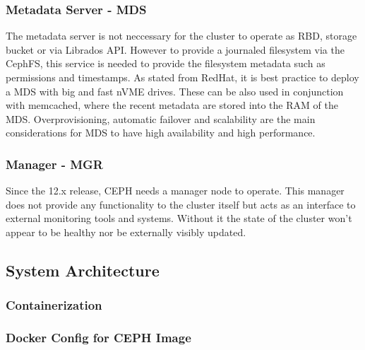 \documentclass[titlepage, a4paper, 11pt]{scrartcl}
\begin{document}
            \subsubsection{Metadata Server - MDS}

                The metadata server is not neccessary for the cluster to operate as RBD, storage bucket or via Librados API.
                However to provide a journaled filesystem via the CephFS, this service is needed to provide the filesystem metadata such
                as permissions and timestamps. As stated from RedHat, it is best practice to deploy a MDS with big and fast nVME drives\cite{redhatstudy}.
                These can be also used in conjunction with memcached, where the recent metadata are stored into the RAM of the MDS.
                Overprovisioning, automatic failover and scalability are the main considerations for MDS to have high availability and high performance.

            \subsubsection{Manager - MGR}   
            
                Since the 12.x release, CEPH needs a manager node to operate\cite{MGRcephDocu}. This manager does not provide any
                functionality to the cluster itself but acts as an interface to external monitoring tools and systems. Without it 
                the state of the cluster won't appear to be healthy nor be externally visibly updated\cite{MGRcephDocu}.                

        \subsection{System Architecture}


            \subsubsection{Containerization}\label{system:containerization}


            \subsubsection{Docker Config for CEPH Image}
\end{document}
